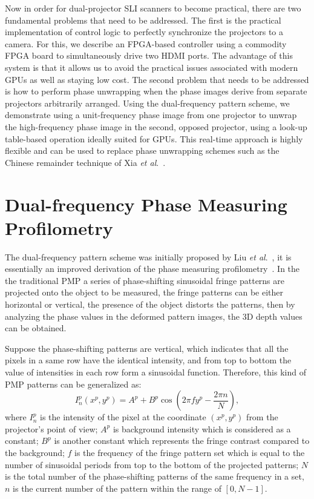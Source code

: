 \documentclass[]{spie}  %
\begin{document}
Now in order for dual-projector SLI scanners to become practical, there are two fundamental problems that need to be addressed.  The first is the practical implementation of control logic to perfectly synchronize the projectors to a camera.  For this, we describe an FPGA-based controller using a commodity FPGA board to simultaneously drive two HDMI ports.  The advantage of this system is that it allows us to avoid the practical issues associated with modern GPUs as well as staying low cost.  The second problem that needs to be addressed is how to perform phase unwrapping when the phase images derive from separate projectors arbitrarily arranged.  Using the dual-frequency pattern scheme, we demonstrate using a unit-frequency phase image from one projector to unwrap the high-frequency phase image in the second, opposed projector, using a look-up table-based operation ideally suited for GPUs. This real-time approach is highly flexible and can be used to replace phase unwrapping schemes such as the Chinese remainder technique of Xia \textit{et al}.~\cite{xiax07}.

\section{Dual-frequency Phase Measuring Profilometry}
The dual-frequency pattern scheme was initially proposed by Liu \textit{et al}.~\cite{liuk10}, it is essentially  an improved derivation of the phase measuring profilometry~\cite{hali89}. In the the traditional PMP a series of phase-shifting sinusoidal fringe patterns are projected onto the object to be measured, the fringe patterns can be either horizontal or vertical, the presence of the object distorts the patterns, then by analyzing the phase values in the deformed pattern images, the 3D depth values can be obtained.

Suppose the phase-shifting patterns are vertical, which indicates that all the pixels in a same row have the identical intensity, and from top to bottom the value of intensities in each row form a sinusoidal function. Therefore, this kind of PMP patterns can be generalized as:
 \begin{equation} \label{eq:1.1}
  	I^p_n(x^p, y^p) = A^p + B^p\cos\left(2\pi f y^p - \frac{2\pi n}{N}\right),
  \end{equation}
where $I^p_n$ is the intensity of the pixel at the coordinate $(x^p, y^p)$ from the projector's point of view; $A^p$ is background intensity which is considered as a constant; $B^p$ is another constant which represents the fringe contrast compared to the background; $f$ is the frequency of the fringe pattern set which is equal to the number of sinusoidal periods from top to the bottom of the projected patterns; $N$ is the total number of the phase-shifting patterns of the same frequency in a set, $n$ is the current number of the pattern within the range of $[0, N-1]$.
\end{document}
